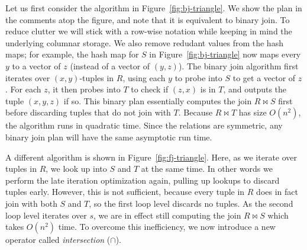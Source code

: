 Let us first consider the algorithm in Figure~\ref{fig:bj-triangle}.
We show the \FJ plan in the comments atop the figure,
and note that it is equivalent to binary join.
To reduce clutter we will stick with a row-wise notation
while keeping in mind the underlying columnar storage.
We also remove redudant values from the hash maps;
for example, the hash map for $S$ in Figure~\ref{fig:bj-triangle}
now maps every $y$ to a vector of $z$ (instead of a vector of $(y, z)$).
The binary join algorithm first iterates over $(x, y)$-tuples in $R$,
using each $y$ to probe into $S$ to get a vector of $z$.
For each $z$, it then probes into $T$ to check if $(z, x)$ is in $T$,
and outputs the tuple $(x, y, z)$ if so.
This binary plan essentially computes the join $R \bowtie S$ first
before discarding tuples that do not join with $T$.
Because $R\bowtie T$ has size $O(n^2)$,
the algorithm runs in quadratic time.
Since the relations are symmetric, any binary join plan
will have the same asymptotic run time.

A different algorithm is shown in Figure~\ref{fig:fj-triangle}.
Here, as we iterate over tuples in $R$, we look up into $S$ and $T$
at the same time.
In other words we perform the late iteration optimization again,
pulling up lookups to discard tuples early.
However, this is not sufficient, because every tuple in $R$
does in fact join with both $S$ and $T$,
so the first loop level discards no tuples.
As the second loop level iterates over $s$,
we are in effect still computing the join $R \bowtie S$
which takes $O(n^2)$ time.
To overcome this inefficiency, we now introduce a new operator
called {\em intersection} ($\cap$).

